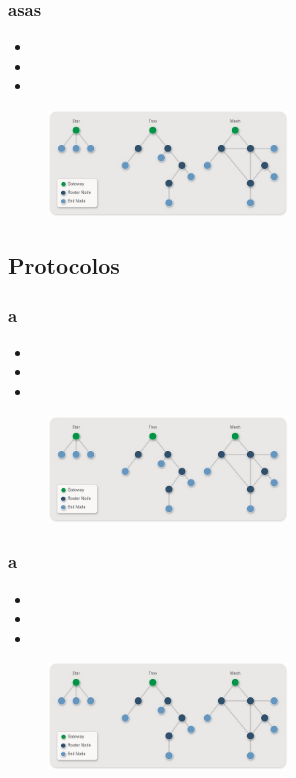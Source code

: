 \documentclass{beamer}
\begin{document}
\begin{frame}
\frametitle{asas}
\begin{itemize}
\item 
\item 
\item 
\end{itemize}
\begin{figure}[!h]
\centering
\includegraphics[width=2.5in]{topologias}
\end{figure}
\end{frame}

\subsection{Protocolos}

\begin{frame}
\frametitle{a}
\begin{itemize}
\item 
\item 
\item 
\end{itemize}
\begin{figure}[!h]
\centering
\includegraphics[width=2.5in]{topologias}
\end{figure}
\end{frame}

\begin{frame}
\frametitle{a}
\begin{itemize}
\item 
\item 
\item 
\end{itemize}
\begin{figure}[!h]
\centering
\includegraphics[width=2.5in]{topologias}
\end{figure}
\end{frame}
\end{document}
